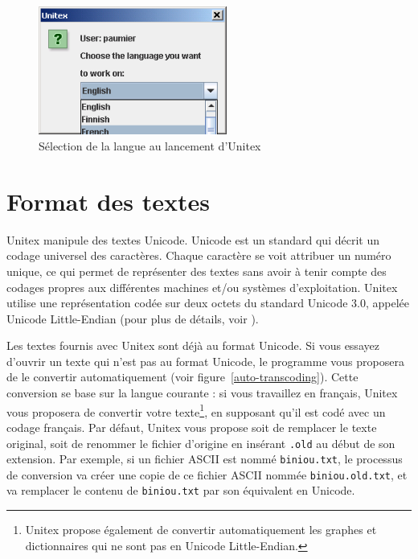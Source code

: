 \begin{figure}[!ht]
\begin{center}
\includegraphics[width=6.2cm]{resources/img/fig2-1.png}
\caption{\label{fig-language-selection}Sélection de la langue au lancement d’Unitex}
\end{center}
\end{figure}


\section{Format des textes}
\label{section-conversion-texte-unicode}
Unitex manipule des textes Unicode. Unicode est un standard qui décrit un codage universel 
des caractères. Chaque caractère se voit attribuer un numéro unique, ce qui permet
de représenter des textes sans avoir à tenir compte des codages propres aux différentes 
machines et/ou systèmes d’exploitation. Unitex utilise une représentation codée sur deux 
octets du standard Unicode 3.0, appelée Unicode Little-Endian (pour plus de détails, voir
\cite{UNICODE}).

\bigskip
{}
\noindent Les textes fournis avec Unitex sont déjà au format Unicode. Si vous essayez d’ouvrir un
texte qui n’est pas au format Unicode, le programme vous proposera de le convertir automatiquement 
(voir figure~\ref{auto-transcoding}). Cette conversion se base sur la langue courante : si vous
travaillez en français, Unitex vous proposera de convertir votre texte\footnote{Unitex propose
également de convertir automatiquement les graphes et dictionnaires qui ne sont pas en Unicode
Little-Endian.}, en supposant qu’il est codé avec un codage français. Par défaut, Unitex vous
propose soit de remplacer le texte original, soit de renommer le fichier d’origine en insérant
\verb$.old$ au début de son extension. Par exemple, si un fichier ASCII est nommé \verb$biniou.txt$,
le processus de conversion va créer une copie de ce fichier ASCII nommée \verb$biniou.old.txt$, et
va remplacer le contenu de \verb$biniou.txt$ par son équivalent en Unicode.

